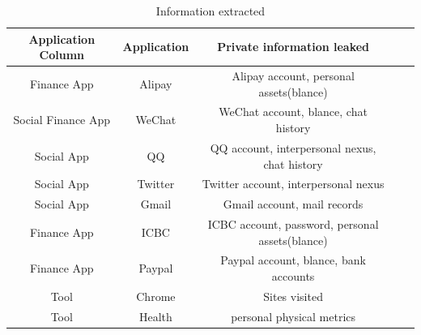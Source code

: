 \begin{table}[t]
	\centering
	\begin{tabular}{|c|c|c|c|c|}
		\hline
		Application Column  & Application & Private information leaked                       \\
		\hline
		Finance App         & Alipay      & Alipay account, personal assets(blance)          \\
		\hline
		Social  Finance App & WeChat      & WeChat account, blance, chat history             \\
		\hline
		Social App          & QQ          & QQ account, interpersonal nexus, chat history    \\
		\hline
		Social App          & Twitter     & Twitter account, interpersonal nexus             \\
		\hline
		Social App          & Gmail       & Gmail account, mail records                      \\
		\hline
		Finance App         & ICBC        & ICBC account, password, personal assets(blance)  \\
		\hline
		Finance App         & Paypal      & Paypal account, blance, bank accounts            \\
		\hline
		Tool                & Chrome      & Sites visited                                    \\
		\hline
		Tool                & Health      & personal physical metrics      					 \\
		\hline
	\end{tabular}
	\linebreak
	\caption{Information extracted}
	\label{table:information_extracted}
\end{table}